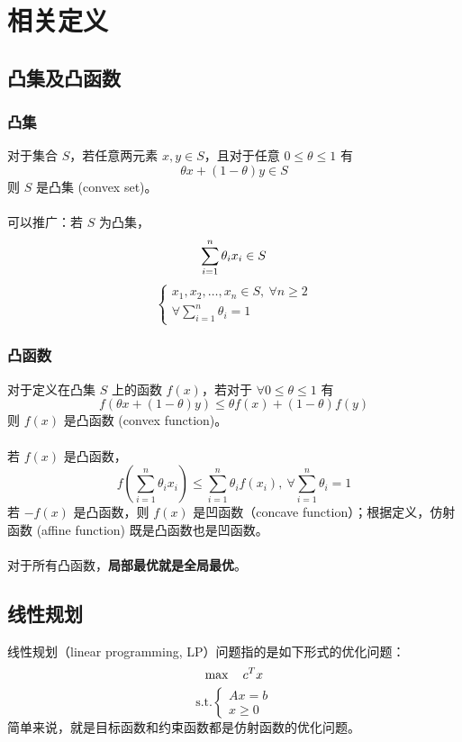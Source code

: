 \section{相关定义}
\subsection{凸集及凸函数}
\subsubsection{凸集}
对于集合 $S$，若任意两元素 $x, y \in S$，且对于任意 $0 \le \theta \le 1$ 有 
$$
\theta x + (1-\theta)y \in S
$$
则 $S$ 是凸集 (convex set)。 \\~\\
可以推广：若 $S$ 为凸集， 
$$
\sum_{i=1}^n \theta_ix_i \in S \\
$$
$$
\begin{cases}
x_1, x_2, \dots, x_n \in S, \  \forall n \ge 2 \\
\forall \sum_{i=1}^n \theta_i = 1
\end{cases}
$$

\subsubsection{凸函数}
对于定义在凸集 $S$ 上的函数 $f(x)$，若对于 $\forall 0 \le \theta \le 1$ 有
$$
f(\theta x + (1-\theta) y) \le \theta f(x) + (1-\theta) f(y)
$$
则 $f(x)$ 是凸函数 (convex function)。 \\~\\
若 $f(x)$ 是凸函数，
$$
f(\sum_{i=1}^n \theta_ix_i) \le \sum_{i=1}^n \theta_i f(x_i), \ \forall \sum_{i=1}^n \theta_i = 1
$$
若 $-f(x)$ 是凸函数，则 $f(x)$ 是凹函数（concave function）；根据定义，仿射函数 (affine function) 既是凸函数也是凹函数。 \\~\\
对于所有凸函数，\textbf{局部最优就是全局最优}。

\subsection{线性规划}
线性规划（linear programming, LP）问题指的是如下形式的优化问题：
$$
\max \quad c^Tx \\
$$
$$
\text{s.t.} 
\begin{cases}
    Ax = b \\ 
    x \ge 0    
\end{cases}
$$
简单来说，就是目标函数和约束函数都是仿射函数的优化问题。

